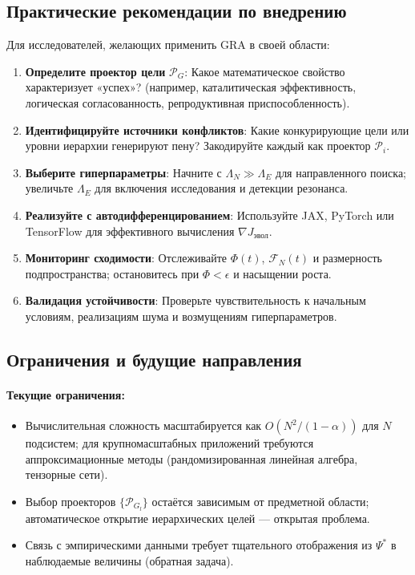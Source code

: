 \documentclass[11pt,a4paper]{article}
\theoremstyle{plain}
\theoremstyle{definition}
\theoremstyle{remark}
\newcommand{\Foam}{\Phi}
\newcommand{\Projector}{\mathcal{P}}
\newcommand{\Functional}{\mathcal{F}}
\newcommand{\grad}{\nabla}
\begin{document}
\subsection{Практические рекомендации по внедрению}

Для исследователей, желающих применить GRA в своей области:

\begin{enumerate}[label=\textbf{Шаг \arabic*:}, leftmargin=*]
    \item \textbf{Определите проектор цели} $\Projector_G$: Какое математическое свойство характеризует «успех»? (например, каталитическая эффективность, логическая согласованность, репродуктивная приспособленность).
    
    \item \textbf{Идентифицируйте источники конфликтов}: Какие конкурирующие цели или уровни иерархии генерируют пену? Закодируйте каждый как проектор $\Projector_i$.
    
    \item \textbf{Выберите гиперпараметры}: Начните с $\Lambda_N \gg \Lambda_E$ для направленного поиска; увеличьте $\Lambda_E$ для включения исследования и детекции резонанса.
    
    \item \textbf{Реализуйте с автодифференцированием}: Используйте JAX, PyTorch или TensorFlow для эффективного вычисления $\grad J_{\text{эвол}}$.
    
    \item \textbf{Мониторинг сходимости}: Отслеживайте $\Foam(t)$, $\Functional_N(t)$ и размерность подпространства; остановитесь при $\Foam < \epsilon$ и насыщении роста.
    
    \item \textbf{Валидация устойчивости}: Проверьте чувствительность к начальным условиям, реализациям шума и возмущениям гиперпараметров.
\end{enumerate}

\subsection{Ограничения и будущие направления}

\paragraph{Текущие ограничения:}
\begin{itemize}
    \item Вычислительная сложность масштабируется как $O(N^2/(1-\alpha))$ для $N$ подсистем; для крупномасштабных приложений требуются аппроксимационные методы (рандомизированная линейная алгебра, тензорные сети).
    \item Выбор проекторов $\{\Projector_{G_l}\}$ остаётся зависимым от предметной области; автоматическое открытие иерархических целей --- открытая проблема.
    \item Связь с эмпирическими данными требует тщательного отображения из $\Psi^*$ в наблюдаемые величины (обратная задача).
\end{itemize}
\end{document}
